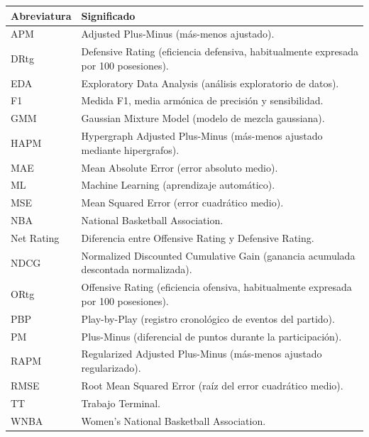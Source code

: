 
\begin{longtable}{@{}p{2.5cm}p{11.5cm}@{}}
\toprule
\textbf{Abreviatura} & \textbf{Significado} \\
\midrule
\endhead
APM & Adjusted Plus-Minus (más-menos ajustado). \\
DRtg & Defensive Rating (eficiencia defensiva, habitualmente expresada por 100 posesiones). \\
EDA & Exploratory Data Analysis (análisis exploratorio de datos). \\
F1 & Medida F1, media armónica de precisión y sensibilidad. \\
GMM & Gaussian Mixture Model (modelo de mezcla gaussiana). \\
HAPM & Hypergraph Adjusted Plus-Minus (más-menos ajustado mediante hipergrafos). \\
MAE & Mean Absolute Error (error absoluto medio). \\
ML & Machine Learning (aprendizaje automático). \\
MSE & Mean Squared Error (error cuadrático medio). \\
NBA & National Basketball Association. \\
Net Rating & Diferencia entre Offensive Rating y Defensive Rating. \\
NDCG & Normalized Discounted Cumulative Gain (ganancia acumulada descontada normalizada). \\
ORtg & Offensive Rating (eficiencia ofensiva, habitualmente expresada por 100 posesiones). \\
PBP & Play-by-Play (registro cronológico de eventos del partido). \\
PM & Plus-Minus (diferencial de puntos durante la participación). \\
RAPM & Regularized Adjusted Plus-Minus (más-menos ajustado regularizado). \\
RMSE & Root Mean Squared Error (raíz del error cuadrático medio). \\
TT & Trabajo Terminal. \\
WNBA & Women's National Basketball Association. \\
\bottomrule
\end{longtable}